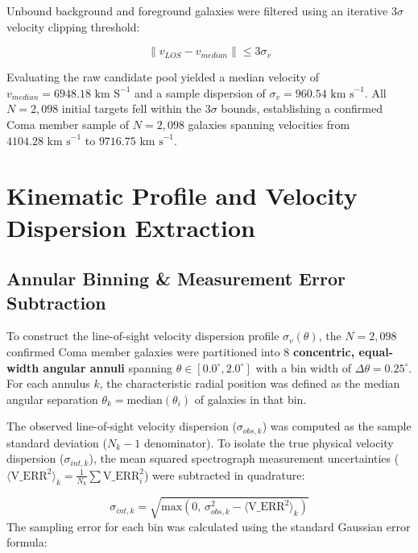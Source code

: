 \documentclass[twocolumn]{aastex631}
\begin{document}
Unbound background and foreground galaxies were filtered using an iterative $3 \sigma$ velocity clipping threshold:

\begin{equation}
	\|v_{LOS}-v_{median}\| \leq 3 \sigma_{v}
\end{equation}

Evaluating the raw candidate pool yielded a median velocity of $v_{median}=6948.18 \text{ km S}^{-1}$ and a sample dispersion of $\sigma_{v} = 960.54 \text{ km s}^{-1}$. All $N=2,098$ initial targets fell within the $3\sigma$ bounds, establishing a confirmed Coma member sample of $N=2,098$ galaxies spanning velocities from $4104.28 \text{ km s}^{-1}$ to $9716.75 \text{ km s}^{-1}$.

\section{Kinematic Profile and Velocity Dispersion Extraction}
\label{sec:velocity_dispersion}

\subsection{Annular Binning \& Measurement Error Subtraction}

To construct the line-of-sight velocity dispersion profile $\sigma_{v}(\theta)$, the $N=2,098$ confirmed Coma member galaxies were partitioned into 8 \textbf{concentric, equal-width angular annuli} spanning $\theta \in [0.0^{\circ},2.0^{\circ}]$ with a bin width of $\Delta \theta = 0.25^{\circ}$. For each annulus $k$, the characteristic radial position was defined as the median angular separation $\theta_{k} = \text{median}(\theta_{i})$ of galaxies in that bin.

The observed line-of-sight velocity dispersion ($\sigma_{obs,k}$) was computed as the sample standard deviation ($N_{k} - 1$ denominator). To isolate the true physical velocity dispersion ($\sigma_{int,k}$), the mean squared spectrograph measurement uncertainties ($\langle \text{V\_ERR}^{2}\rangle_{k}=\frac{1}{N_{k}} \sum \text{V\_ERR}_{i}^{2}$) were subtracted in quadrature:

\begin{equation}
	\sigma_{int,k}=\sqrt{\text{max}(0,\,\sigma_{obs,k}^{2}-\langle \text{V\_ERR}^{2}\rangle_{k})}
\end{equation}
The sampling error for each bin was calculated using the standard Gaussian error formula:
\end{document}
